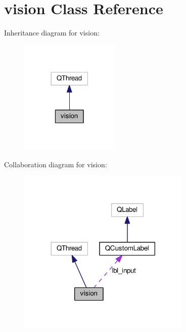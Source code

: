 \hypertarget{classvision}{}\section{vision Class Reference}
\label{classvision}


Inheritance diagram for vision\+:
\nopagebreak
\begin{figure}[H]
\begin{center}
\leavevmode
\includegraphics[width=134pt]{classvision__inherit__graph}
\end{center}
\end{figure}


Collaboration diagram for vision\+:
\nopagebreak
\begin{figure}[H]
\begin{center}
\leavevmode
\includegraphics[width=234pt]{classvision__coll__graph}
\end{center}
\end{figure}
